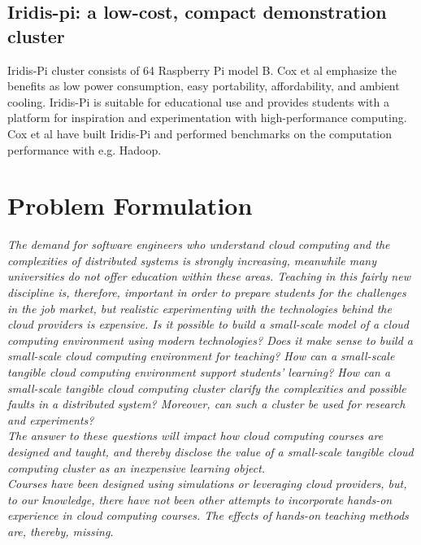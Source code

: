 \subsection*{Iridis-pi: a low-cost, compact demonstration cluster \cite{cox2014iridis}}
Iridis-Pi cluster consists of 64 Raspberry Pi model B. Cox et al emphasize the benefits as low power consumption, easy portability, affordability, and ambient cooling. Iridis-Pi is suitable for educational use and provides students with a platform for inspiration and experimentation with high-performance computing.
Cox et al have built Iridis-Pi and performed benchmarks on the computation performance with e.g. Hadoop.


\section{Problem Formulation}

\textit{The demand for software engineers who understand cloud computing and the complexities of distributed systems is strongly increasing, meanwhile many universities do not offer education within these areas. Teaching in this fairly new discipline is, therefore, important in order to prepare students for the challenges in the job market, but realistic experimenting with the technologies behind the cloud providers is expensive. Is it possible to build a small-scale model of a cloud computing environment using modern technologies? Does it make sense to build a small-scale cloud computing environment for teaching? How can a small-scale tangible cloud computing environment support students’ learning? How can a small-scale tangible cloud computing cluster clarify the complexities and possible faults in a distributed system? Moreover, can such a cluster be used for research and experiments? } \\

\noindent\textit{The answer to these questions will impact how cloud computing courses are designed and taught, and thereby disclose the value of a small-scale tangible cloud computing cluster as an inexpensive learning object.} \\

\noindent\textit{Courses have been designed using simulations or leveraging cloud providers, but, to our knowledge, there have not been other attempts to incorporate hands-on experience in cloud computing courses. The effects of hands-on teaching methods are, thereby, missing.} \\

